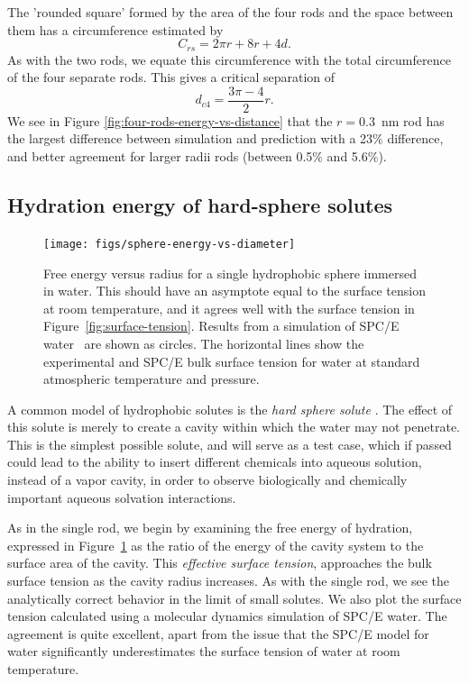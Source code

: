 \documentclass[letterpaper,twocolumn,amsmath,amssymb,prb]{revtex4-1}
\begin{document}
The 'rounded square' formed by the area of the four rods and the space
between them has a circumference estimated by
\begin{equation}
C_{rs} = 2 \pi r + 8r + 4d.
\end{equation}
As with the two rods, we equate this circumference with the total circumference of
the four separate rods. This gives a critical separation of
\begin{equation}
d_{c4} = \frac{3 \pi - 4}{2} r. \label{criticalfourrods}
\end{equation}
We see in Figure \ref{fig:four-rods-energy-vs-distance} that the $r = 0.3$~nm
rod has the largest difference between simulation and prediction with
a 23\% difference, and better agreement for larger radii rods (between 0.5\% and 5.6\%).

\subsection{Hydration energy of hard-sphere solutes}

\begin{figure}
\begin{center}
\texttt{[image: figs/sphere-energy-vs-diameter]}
\end{center}
\caption{ Free energy versus radius for a single hydrophobic sphere
  immersed in water. This should have an asymptote equal to the
  surface tension at room temperature, and it agrees well with the
  surface tension in Figure~\ref{fig:surface-tension}. Results from a
  simulation of SPC/E water~\cite{huang2001shs} are shown as circles.
  The horizontal lines show the experimental and SPC/E bulk surface
  tension for water at standard atmospheric temperature and
  pressure. }
\label{fig:sphere-energy-vs-diameter}
\end{figure}

A common model of hydrophobic solutes is the \emph{hard sphere solute}
\cite{sedlmeier2011entropy}.  The effect of this solute is merely to create
a cavity within which the water may not penetrate.  This is the
simplest possible solute, and will serve as a test case, which if
passed could lead to the ability to insert different chemicals into
aqueous solution, instead of a vapor cavity, in order to observe
biologically and chemically important aqueous solvation interactions.

As in the single rod, we begin by examining the free energy of
hydration, expressed in Figure~\ref{fig:sphere-energy-vs-diameter} as
the ratio of the energy of the cavity system to the surface area of
the cavity.  This \emph{effective surface tension}, approaches the
bulk surface tension as the cavity radius increases.  As with the
single rod, we see the analytically correct behavior in the limit of
small solutes.  We also plot the surface tension calculated using a
molecular dynamics simulation of SPC/E water\cite{huang2001shs}.  The
agreement is quite excellent, apart from the issue that the SPC/E
model for water significantly underestimates the surface tension of
water at room temperature\cite{vega2007surface}.
\end{document}
